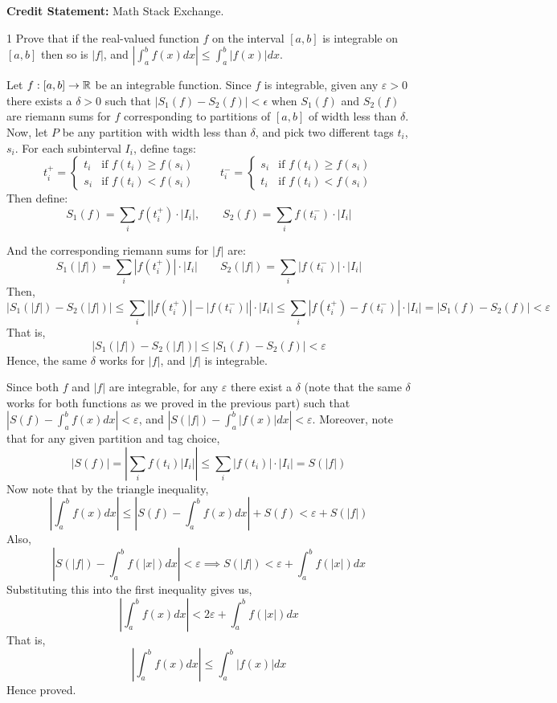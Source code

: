 \documentclass[12pt]{article}
\begin{document}

\textbf{Credit Statement:} Math Stack Exchange.

\begin{problem}{1}
    Prove that if the real-valued function $f$ on the interval $[a, b]$ is integrable on $[a,b]$ then so is $|f|$, and $\left | \int_a^b f(x) dx \right | \leq \int_a^b |f(x)|dx$. 
\end{problem}

\begin{solution}
    \bbni 

    Let $f: [a,b] \to \mathbb R$ be an integrable function. 
    Since $f$ is integrable, given any $\varepsilon > 0$ there exists a $\delta >0$ such that $|S_1(f) - S_2(f)| < \epsilon$ when $S_1(f)$ and $S_2(f)$ are riemann sums for $f$ corresponding to partitions of $[a,b]$ of width less than $\delta$. 
    Now, let $P$ be any partition with width less than $\delta$, and pick two different tags $t_i$, $s_i$. For each subinterval $I_i$, define tags:
    \[
    t_i^+ = \begin{cases} t_i & \text{if } f(t_i) \geq f(s_i) \\ s_i & \text{if } f(t_i) < f(s_i) \end{cases} \qquad 
    t_i^- = \begin{cases} s_i & \text{if } f(t_i) \geq f(s_i) \\ t_i & \text{if } f(t_i) < f(s_i) \end{cases}
    \]
    Then define:
    \[S_1(f) = \sum_i f(t_i^+) \cdot |I_i|, \qquad S_2 (f)= \sum_i f(t_i^-) \cdot |I_i|\]
    
    And the corresponding riemann sums for $|f|$ are: 
    \[S_1(|f|) = \sum_{i}|f(t_i^+)| \cdot |I_i| \qquad S_2(|f|) = \sum_{i}|f(t_i^-)|\cdot |I_i|\]
    Then, 
    \[|S_1(|f|) - S_2(|f|)| \leq \sum_{i} \left | |f(t_i^+)| - |f(t_i^-)| \right | \cdot |I_i| \leq \sum_i |f(t_i^+) - f(t_i^-)| \cdot |I_i| = |S_1(f) - S_2(f)| < \varepsilon\]
    That is, 
    \[|S_1(|f|) - S_2(|f|)| \leq  |S_1(f) - S_2(f)| < \varepsilon\]
    Hence, the same $\delta$ works for $|f|$, and $|f|$ is integrable. 
    
    Since both $f$ and $|f|$ are integrable, for any $\varepsilon$ there exist a $\delta$ (note that the same $\delta$ works for both functions as we proved in the previous part) such that $\left| S(f) - \int_a^b f(x) dx \right| < \varepsilon$, and $\left| S(|f|) - \int_a^b |f(x)| dx \right| < \varepsilon$. Moreover, note that for any given partition and tag choice, 
    \[|S(f)| = \left| \sum_i f(t_i)|I_i|\right| \leq \sum_i|f(t_i)|\cdot |I_i| = S(|f|)\]
    Now note that by the triangle inequality, 
    \[\left| \int_a^b f(x) dx \right| \leq \left| S(f) - \int_a^b f(x) dx \right| + S(f) < \varepsilon + S(|f|)\]
    Also, 
    \[\left| S(|f|) - \int_a^b f(|x|) dx \right|  < \varepsilon \implies S(|f|) < \varepsilon + \int_a^b f(|x|) dx \]
    Substituting this into the first inequality gives us, 
    \[\left| \int_a^b f(x) dx \right|  < 2\varepsilon + \int_a^b f(|x|)dx\]
    That is, 
    \[\left | \int_a^b f(x) dx \right | \leq \int_a^b |f(x)|dx\]
    Hence proved.
\end{solution}
\end{document}

